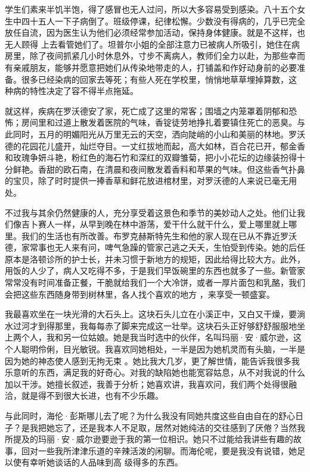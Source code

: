 \documentclass{article}
\begin{document}
学生们素来半饥半饱，得了感冒也无人过问，所以大多容易受到感染。八十五个女生中四十五人一下子病倒了。班级停课，纪律松懈。少数没有得病的，几乎已完全放任自流，因为医生认为他们必须经常参加活动，保持身体健康。就是不这样，也无人顾得
\newpage
上去看管她们了。坦普尔小姐的全部注意力已被病人所吸引，她住在病房里，除了夜间抓紧几小时休息外，寸步不离病人，教师们全力以赴，为那些幸而有亲戚朋友，能够并愿意把她们从传染地带走的人，打铺盖和作好动身前的必要准备。很多已经染病的回家去等死；有些人死在学校里，悄悄地草草埋掉算数，这
种病的特性决定了容不得半点拖延。 

就这样，疾病在罗沃德安了家，死亡成了这里的常客；围墙之内笼罩着阴郁和恐怖；房间里和过道上散发着医院的气味，香锭徒劳地挣扎着要镇住死亡的恶臭。与此同时，五月的明媚阳光从万里无云的天空，洒向陡峭的小山和美丽的林地。罗沃德的花园花儿盛开，灿烂夺目。一丈红拔地而起，高大如林，百合花已开，郁金香和玫瑰争妍斗艳，粉红色的海石竹和深红的双瓣雏菊，把小小花坛的边缘装扮得十分鲜艳。香甜的欧石南，在清晨和夜间散发着香料和苹果的气味。但这些香气扑鼻的宝贝，除了时时提供一捧香草和鲜花放进棺材里，对罗沃德的人来说已毫无用
处。 

\newpage

不过我与其余仍然健康的人，充分享受着这景色和季节的美妙动人之处。他们让我们像吉卜赛人一样，从早到晚在林中游荡，爱干什么就干什么，爱上哪里就上哪里。我们的生活也有所改善。布罗克赫斯特先生和他的家人现在已从不靠近罗沃德，家常事也无人来有问，啤气急躁的管家己逃之夭夭，生怕受到传染。她的后任原本是洛顿诊所的护士长，并未习惯于新地方的规矩，因此给得比较大方。此外，用饭的人少了，病人又吃得不多，于是我们早饭碗里的东西也就多了一些。新管家常常没有时间准备正餐，干脆就给我们一个大冷饼，或者一厚片面包和乳酪，我们会把这些东西随身带到树林里，各人找个喜欢的地方
，来享受一顿盛宴。 

我最喜欢坐在一块光滑的大石头上。这块石头儿立在小溪正中，又白又干燥，要淌水过河才到得那里，我每每赤了脚来完成这一壮举。这块石头正好够舒舒服服地坐上两个人，我和另一位姑娘。她是我当时选中的伙伴，名叫玛丽·安·威尔逊，这个人聪明伶俐，目光敏锐。我喜欢同她相处，一半是因为她机灵而有头脑，一半是因为她的神态使人感到无拘无束
\newpage
。她比我大几岁，更了解世情，能告诉我很多我乐意听的东西，满足我的好奇心。对我的缺陷她也能宽容姑息，从不对我说的什么加以干涉。她擅长叙述，我善于分析；她喜欢讲，我喜欢问，我们两个处得很融
洽，就是得不到很大长进，也有不少乐趣。 

与此同时，海伦·彭斯哪儿去了呢？为什么我没有同她共度这些自由自在的舒心日子？是我把她忘了，还是我本人不足取，居然对她纯洁的交往感到了厌倦？当然我所提及的玛丽·安·威尔逊要逊于我的第一位相识。她只不过能给我讲些有趣的故事，回对一些我所津津乐道的辛辣活泼的闲聊。而海伦呢，要是我没有说错，她足以使有幸听她谈话的人品味到高
级得多的东西。 
\end{document}
